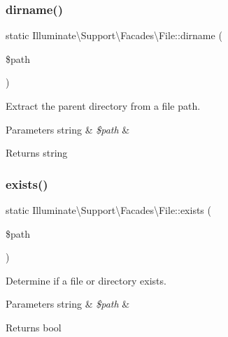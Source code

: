 \subsubsection{\texorpdfstring{dirname()}{dirname()}}
{\footnotesize\ttfamily static Illuminate\textbackslash{}\+Support\textbackslash{}\+Facades\textbackslash{}\+File\+::dirname (\begin{DoxyParamCaption}\item[{}]{\$path }\end{DoxyParamCaption})\hspace{0.3cm}{\ttfamily [static]}}

Extract the parent directory from a file path.


\begin{DoxyParams}[1]{Parameters}
string & {\em \$path} & \\
\hline
\end{DoxyParams}
\begin{DoxyReturn}{Returns}
string 
\end{DoxyReturn}
\mbox{\label{class_illuminate_1_1_support_1_1_facades_1_1_file_a4b807c44b40f3f20c403e8bbed8b0a13}} 
\subsubsection{\texorpdfstring{exists()}{exists()}}
{\footnotesize\ttfamily static Illuminate\textbackslash{}\+Support\textbackslash{}\+Facades\textbackslash{}\+File\+::exists (\begin{DoxyParamCaption}\item[{}]{\$path }\end{DoxyParamCaption})\hspace{0.3cm}{\ttfamily [static]}}

Determine if a file or directory exists.


\begin{DoxyParams}[1]{Parameters}
string & {\em \$path} & \\
\hline
\end{DoxyParams}
\begin{DoxyReturn}{Returns}
bool 
\end{DoxyReturn}
\mbox{\label{class_illuminate_1_1_support_1_1_facades_1_1_file_a7fc0f3705cb3d6558796740a09d7c741}} 
